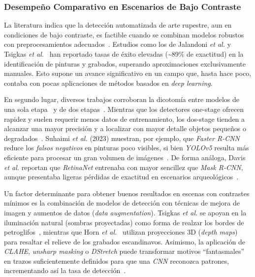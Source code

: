 \subsubsection{Desempeño Comparativo en Escenarios de Bajo Contraste}

La literatura indica que la detección automatizada de arte rupestre, aun en condiciones de bajo contraste, es factible cuando se combinan modelos robustos con preprocesamientos adecuados~\cite{fattal2007}.
Estudios como los de Jalandoni \textit{et al.} y Tsigkas \textit{et al.}~\cite{jalandoni2022,tsigkas2020} han reportado tasas de éxito elevadas (\textasciitilde 89\% de exactitud) en la identificación de pinturas y grabados, superando aproximaciones exclusivamente manuales.
Esto supone un avance significativo en un campo que, hasta hace poco, contaba con pocas aplicaciones de métodos basados en \textit{deep learning}.

En segundo lugar, diversos trabajos corroboran la dicotomía entre modelos de una sola etapa~\cite{yolov5,lin2017focal} y de dos etapas~\cite{ren2015faster}.
Mientras que los detectores one-stage ofrecen rapidez y suelen requerir menos datos de entrenamiento, los dos-stage tienden a alcanzar una mayor precisión y a localizar con mayor detalle objetos pequeños o degradados~\cite{davis2021,suhaimi2023}.
Suhaimi \textit{et al.} (2023) muestran, por ejemplo, que \textit{Faster R-CNN} reduce los \emph{falsos negativos} en pinturas poco visibles, si bien \textit{YOLOv5} resulta más eficiente para procesar un gran volumen de imágenes~\cite{suhaimi2023}.
De forma análoga, Davis \textit{et al.} reportan que \textit{RetinaNet} entrenaba con mayor sencillez que \textit{Mask R-CNN}, aunque presentaba ligeras pérdidas de exactitud en escenarios arqueológicos~\cite{davis2021}.

Un factor determinante para obtener buenos resultados en escenas con contrastes mínimos es la combinación de modelos de detección con técnicas de mejora de imagen y aumentos de datos (\textit{data augmentation}).
Tsigkas \textit{et al.} se apoyan en la iluminación natural (sombras proyectadas) como forma de realzar los bordes de petroglifos~\cite{tsigkas2020}, mientras que Horn \textit{et al.}~\cite{horn2022} utilizan proyecciones 3D (\textit{depth maps}) para resaltar el relieve de los grabados escandinavos.
Asimismo, la aplicación de \textit{CLAHE}, \textit{unsharp masking} o \textit{DStretch} puede transformar motivos “fantasmales” en trazos suficientemente definidos para que una \textit{CNN} reconozca patrones, incrementando así la tasa de detección~\cite{suhaimi2023,davis2021}.

